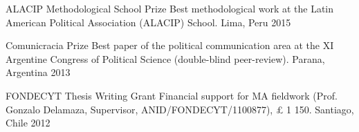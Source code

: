 


\begin{cvhonors}
\cvhonor
{ALACIP Methodological School Prize}
{Best methodological work at the Latin American Political Association (ALACIP) School.}
{Lima, Peru}
{2015}
\end{cvhonors}

\vspace{1mm}





\begin{cvhonors}
\cvhonor
{Comunicracia Prize}
{Best paper of the political communication area at the XI Argentine Congress of Political Science (double-blind peer-review).} %
{Parana, Argentina}
{2013}
\end{cvhonors}

\vspace{1mm}



\begin{cvhonors}
\cvhonor
{FONDECYT Thesis Writing Grant}
{Financial support for MA fieldwork (Prof. Gonzalo Delamaza, Supervisor, ANID/FONDECYT/1100877), {\pounds} 1 150.}
{Santiago, Chile}
{2012}
\end{cvhonors}

\vspace{1mm}
